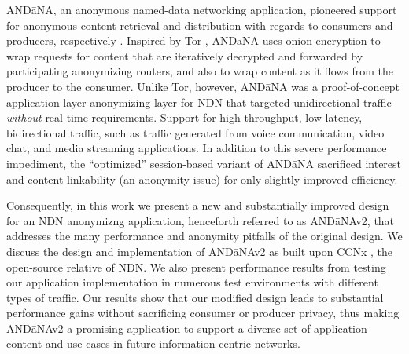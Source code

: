 {\sf AND\=aNA}, an anonymous named-data networking application, pioneered support for anonymous content retrieval and distribution with regards to consumers and producers, respectively \cite{andana}. Inspired by Tor \cite{Tor}, {\sf AND\=aNA} uses onion-encryption to wrap requests for content that are iteratively decrypted and forwarded by participating anonymizing routers, and also to wrap content as it flows from the producer to the consumer. Unlike Tor, however, {\sf AND\=aNA} was a proof-of-concept application-layer anonymizing layer for NDN that targeted unidirectional traffic \emph{without} real-time requirements. Support for high-throughput, low-latency, bidirectional traffic, such as traffic generated from voice communication, video chat, and media streaming applications. In addition to this severe performance impediment, the ``optimized'' session-based variant of {\sf AND\=aNA} sacrificed interest and content linkability (an anonymity issue) for only slightly improved efficiency. 

Consequently, in this work we present a new and substantially improved design for an NDN anonymizng application, henceforth referred to as {\sf AND\=aNAv2}, that addresses the many performance and anonymity pitfalls of the original design. We discuss the design and implementation of {\sf AND\=aNAv2} as built upon CCNx \cite{ccnx}, the open-source relative of NDN. We also present performance results from testing our application implementation in numerous test environments with different types of traffic. Our results show that our modified design leads to  substantial performance gains without sacrificing consumer or producer privacy, thus making {\sf AND\=aNAv2} a promising application to support a diverse set of application content and use cases in future information-centric networks.
